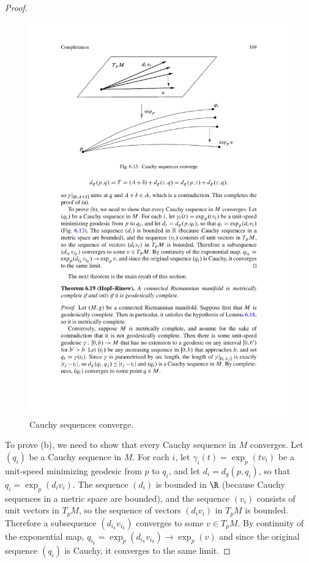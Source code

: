 \begin{proof}
\begin{figure}[htbp]
\includegraphics{pictures/Hopf-Rinow-lem-3}
\caption{Cauchy sequences converge.}
\end{figure}

To prove (b), we need to show that every Cauchy sequence in $M$ converges. Let $(q_i)$ be a Cauchy sequence in $M$. For each $i$, let $\gamma_i(t)=\exp_p(tv_i)$ be a 
unit-speed minimizing geodesic from $p$ to $q_i$, and let $d_i=d_g(p,q_i)$, so that $q_i=\exp_p(d_iv_i)$. The sequence $(d_i)$ is bounded in $\R$ (because Cauchy 
sequences in a metric space are bounded), and the sequence $(v_i)$ consists of unit vectors in $T_pM$, so the sequence of vectors $(d_iv_i)$ in $T_pM$ is bounded. 
Therefore a subsequence $(d_{i_k}v_{i_k})$ converges to some $v\in T_pM$. By continuity of the exponential map, $q_{i_k}=\exp_p(d_{i_k}v_{i_k})\to\exp_p(v)$ and since the 
original sequence $(q_i)$ is Cauchy, it converges to the same limit.
\end{proof}
